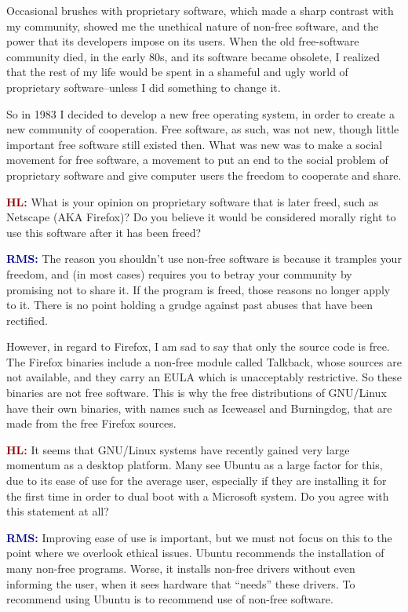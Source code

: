 \documentclass{article}
\newcommand{\hl}{\textcolor{DarkRed}{\textbf{HL: }}}
\newcommand{\rms}{\textcolor{DarkBlue}{\textbf{RMS: }}}
\begin{document}
Occasional brushes with proprietary software, which made a sharp contrast with my community, showed me the unethical nature of non-free software, and the power that its developers impose on its users. When the old free-software community died, in the early 80s, and its software became obsolete, I realized that the rest of my life would be spent in a shameful and ugly world of proprietary software--unless I did something to change it.

So in 1983 I decided to develop a new free operating system, in order to create a new community of cooperation. Free software, as such, was not new, though little important free software still existed then. What was new was to make a social movement for free software, a movement to put an end to the social problem of proprietary software and give computer users the freedom to cooperate and share.

\hl What is your opinion on proprietary software that is later freed, such as Netscape (AKA Firefox)? Do you believe it would be considered morally right to use this software after it has been freed?

\rms The reason you shouldn't use non-free software is because it tramples your freedom, and (in most cases) requires you to betray your community by promising not to share it. If the program is freed, those reasons no longer apply to it. There is no point holding a grudge against past abuses that have been rectified.

However, in regard to Firefox, I am sad to say that only the source code is free. The Firefox binaries include a non-free module called Talkback, whose sources are not available, and they carry an EULA which is unacceptably restrictive. So these binaries are not free software. This is why the free distributions of GNU/Linux have their own binaries, with names such as Iceweasel and Burningdog, that are made from the free Firefox sources.

\hl It seems that GNU/Linux systems have recently gained very large momentum as a desktop platform. Many see Ubuntu as a large factor for this, due to its ease of use for the average user, especially if they are installing it for the first time in order to dual boot with a Microsoft system. Do you agree with this statement at all?

\rms Improving ease of use is important, but we must not focus on this to the point where we overlook ethical issues. Ubuntu recommends the installation of many non-free programs. Worse, it installs non-free drivers without even informing the user, when it sees hardware that ``needs'' these drivers. To recommend using Ubuntu is to recommend use of non-free software.
\end{document}
